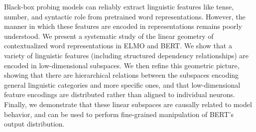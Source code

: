 Black-box probing models can reliably extract linguistic features like tense, number, and syntactic role from pretrained word representations. However, the manner in which these features are encoded in representations remains poorly understood. We present a systematic study of the linear geometry of contextualized word representations in ELMO and BERT. We show that a variety of linguistic features (including structured dependency relationships) are encoded in low-dimensional subspaces. We then refine this geometric picture, showing that there are hierarchical relations between the subspaces encoding general linguistic categories and more specific ones, and that low-dimensional feature encodings are distributed rather than aligned to individual neurons. Finally, we demonstrate that these linear subspaces are causally related to model behavior, and can be used to perform fine-grained manipulation of BERT's output distribution.
